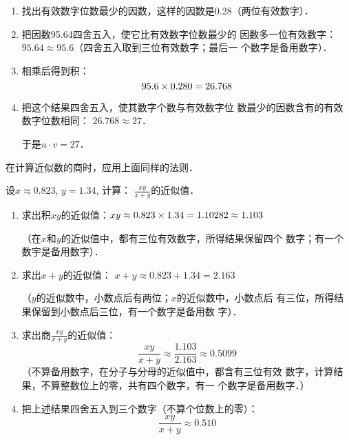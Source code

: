 \begin{solution}
\begin{enumerate}
    \item 找出有效数字位数最少的因数，这样的因数是0.28（两位有效数字）．
    \item 把因数95.64四舍五入，使它比有效数字位数最少的
因数多一位有效数字：$95.64\approx 95.6$（四舍五入取到三位有效数字；最后一
个数字是备用数字）．
\item 相乘后得到积：
\[95.6\times0.280=26.768\]
\item 把这个结果四舍五入，使其数字个数与有效数字位
数最少的因数含有的有效数字位数相同：
$26.768\approx 27$．

于是$u\cdot v=27$．
\end{enumerate}
\end{solution}

在计算近似数的商时，应用上面同样的法则．

\begin{example}
设$x\approx 0.823$, $y=1.34$, 计算：
$\frac{xy}{x+y}$的近似值．
\end{example}


\begin{solution}
\begin{enumerate}
    \item 求出积$xy$的近似值：$xy\approx 0.823\times1.34=1.10282\approx 1.103$
    
    （在$x$和$y$的近似值中，都有三位有效数字，所得结果保留四个
数字；有一个数宇是备用数字）．
\item 求出$x+y$的近似值：
$x+y\approx 0.823+1.34=2.163$

（$y$的近似数中，小数点后有两位；$x$的近似数中，小数点后
有三位，所得结果保留到小数点后三位，有一个数字是备用数
字）．
\item 求出商$\frac{xy}{x+y}$的近似值：
\[\frac{xy}{x+y}\approx \frac{1.103}{2.163}\approx 0.5099\]
（不算备用数字，在分子与分母的近似值中，都含有三位有效
数字，计算结果，不算整数位上的零，共有四个数字，有一
个数字是备用数字．）

\item 把上述结果四舍五入到三个数字（不算个位数上的零）：
\[\frac{xy}{x+y}\approx 0.510\]
\end{enumerate}    
\end{solution}

